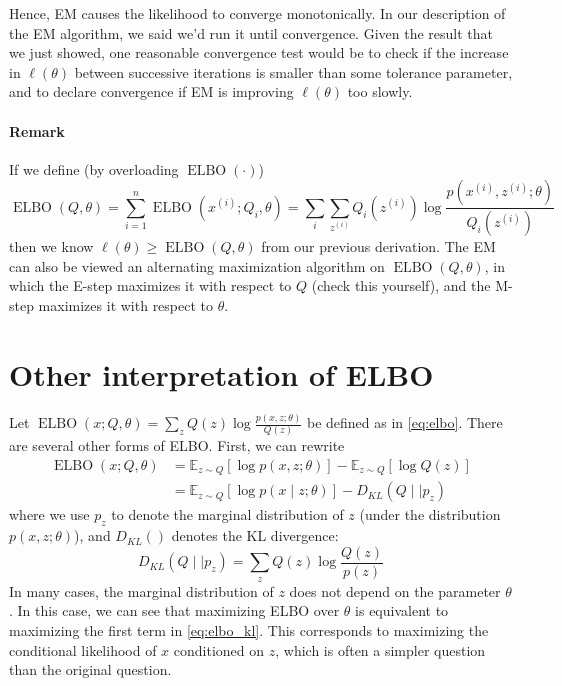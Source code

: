 Hence, EM causes the likelihood to converge monotonically. In our
description of the EM algorithm, we said we'd run it until convergence. Given
the result that we just showed, one reasonable convergence test would be
to check if the increase in $\ell(\theta)$ between successive iterations is smaller than
some tolerance parameter, and to declare convergence if EM is improving
$\ell(\theta)$ too slowly.

\paragraph{Remark} If we define (by overloading $\operatorname{ELBO}(\cdot)$)
\begin{equation}
    \operatorname{ELBO}(Q,\theta) = \sum_{i=1}^n \operatorname{ELBO}(x^{(i)} ;Q_i ,\theta) =
    \sum_{i} \sum_{z^{(i)}} Q_i(z^{(i)}) \log \frac{p(x^{(i)} ,z^{(i)} ;\theta)}{Q_i(z^{(i)})}\label{eq:overload_elbo}
\end{equation}
then we know $\ell(\theta) \ge \operatorname{ELBO}(Q,\theta)$ from our previous derivation. The EM
can also be viewed an alternating maximization algorithm on $\operatorname{ELBO}(Q,\theta)$,
in which the E-step maximizes it with respect to $Q$ (check this yourself), and
the M-step maximizes it with respect to $\theta$.

\section{Other interpretation of ELBO}
Let $\operatorname{ELBO}(x;Q,\theta) = \sum_z Q(z)\log\frac{p(x,z;\theta)}{Q(z)}$ be defined as in \cref{eq:elbo}. There
are several other forms of ELBO. First, we can rewrite
\begin{align}
    \operatorname{ELBO}(x;Q,\theta) &= \mathbb E_{z \sim Q} [\log p(x,z;\theta)] - \mathbb E_{z \sim Q} [\log Q(z)]\\
        &= \mathbb E_{z \sim Q} [\log p(x \mid z;\theta)] - D_{KL} (Q \mid\mid p_z)\label{eq:elbo_kl}
\end{align}
where we use $p_z$ to denote the marginal distribution of $z$ (under the
distribution $p(x,z;\theta)$), and $D_{KL}()$ denotes the KL divergence:
\begin{equation}
    D_{KL} (Q \mid\mid p_z ) = \sum_z Q(z)\log\frac{Q(z)}{p(z)}\label{eq:kl}
\end{equation}
In many cases, the marginal distribution of $z$ does not depend on the
parameter $\theta$. In this case, we can see that maximizing ELBO over $\theta$ is equivalent
to maximizing the first term in \ref{eq:elbo_kl}. This corresponds to maximizing the
conditional likelihood of $x$ conditioned on $z$, which is often a simpler question
than the original question.

